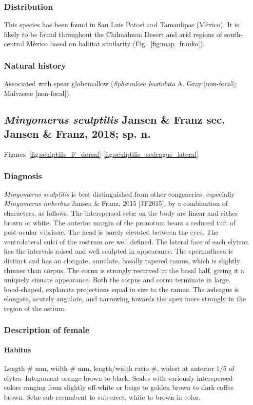 \documentclass[fleqn,10pt,lineno]{wlpeerj} %
\begin{document}
		\subsubsection*{Distribution}
			This species has been found in San Luis Potos\'{i} and Tamaulipas (M\'{e}xico).
			It is likely to be found throughout the Chihuahuan Desert and arid regions of south-central M\'{e}xico based on habitat similarity (Fig.~\ref{fig:map_franko}).
		\subsubsection*{Natural history}
			Associated with spear globemallow (\textit{Sph{\ae}ralcea hastulata} A. Gray [non-focal]; Malvace{\ae} [non-focal]).

	\subsection*{\textit{Minyomerus sculptilis} Jansen \& Franz sec. Jansen \& Franz, 2018; sp. n.}\label{ssec:sculpt}
		Figures~\ref{fig:sculptilis_F_dorsal}-\ref{fig:sculptilis_aedeagus_lateral}
		\subsubsection*{Diagnosis}
			\textit{Minyomerus sculptilis} is best distinguished from other congenerics, especially \textit{Minyomerus imberbus} Jansen \& Franz, 2015 [JF2015], by a combination of characters, as follows.
			The interspersed set{\ae} on the body are linear and either brown or white.
			The anterior margin of the pronotum bears a reduced tuft of post-ocular vibriss{\ae}.
			The head is barely elevated between the eyes.
			The ventrolateral sulci of  the rostrum are well defined.
			The lateral face of each elytron has the intervals raised and well sculpted in appearance.
			The spermatheca is distinct and has an elongate, annulate, basally tapered ramus, which is slightly thinner than corpus.
			The cornu is strongly recurved in the basal half, giving it a uniquely sinuate appearance.
			Both the corpus and cornu terminate in large, hood-shaped, explanate projections equal in size to the ramus.
			The {\ae}deagus is elongate, acutely angulate, and narrowing towards the apex more strongly in the region of the ostium.
		\subsubsection*{Description of female}
			\paragraph{Habitus}
				Length \# mm, width \# mm, length/width ratio \#, widest at anterior 1/5 of elytra.
				Integument orange-brown to black.
				Scales with variously interspersed colors ranging from slightly off-white or beige to golden brown to dark coffee brown.
				Set{\ae} sub-recumbent to sub-erect, white to brown in color.
\end{document}
